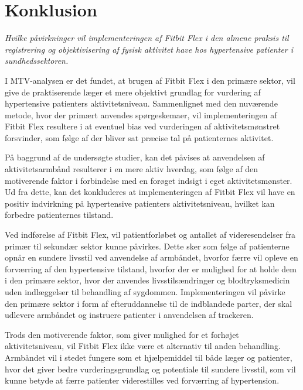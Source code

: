 \chapter{Konklusion}

\textit{Hvilke påvirkninger vil implementeringen af Fitbit Flex i den almene praksis til registrering og objektivisering af fysisk aktivitet have hos hypertensive patienter i sundhedssektoren.}

I MTV-analysen er det fundet, at brugen af Fitbit Flex i den primære sektor, vil give de praktiserende læger et mere objektivt grundlag for vurdering af hypertensive patienters aktivitetsniveau. Sammenlignet med den nuværende metode, hvor der primært anvendes spørgeskemaer, vil implementeringen af Fitbit Flex resultere i at eventuel bias ved vurderingen af aktivitetsmønstret forsvinder, som følge af der bliver sat præcise tal på patienternes aktivitet.

På baggrund af de undersøgte studier, kan det påvises at anvendelsen af aktivitetsarmbånd resulterer i en mere aktiv hverdag, som følge af den motiverende faktor i forbindelse med en forøget indsigt i eget aktivitetsmønster. Ud fra dette, kan det konkluderes at implementeringen af Fitbit Flex vil have en positiv indvirkning på hypertensive patienters aktivitetsniveau, hvilket kan forbedre patienternes tilstand.

Ved indførelse af Fitbit Flex, vil patientforløbet og antallet af videresendelser fra primær til sekundær sektor kunne påvirkes. Dette sker som følge af patienterne opnår en sundere livsstil ved anvendelse af armbåndet, hvorfor færre vil opleve en forværring af den hypertensive tilstand, hvorfor der er mulighed for at holde dem i den primære sektor, hvor der anvendes livsstilsændringer og blodtryksmedicin uden indlæggelser til behandling af sygdommen. Implementeringen vil påvirke den primære sektor i form af efteruddannelse til de indblandede parter, der skal udlevere armbåndet og instruere patienter i anvendelsen af trackeren.

Trods den motiverende faktor, som giver mulighed for et forhøjet aktivitetsniveau, vil Fitbit Flex ikke være et alternativ til anden behandling. Armbåndet vil i stedet fungere som et hjælpemiddel til både læger og patienter, hvor det giver bedre vurderingsgrundlag og potentiale til sundere livsstil, som vil kunne betyde at færre patienter viderestilles ved forværring af hypertension.